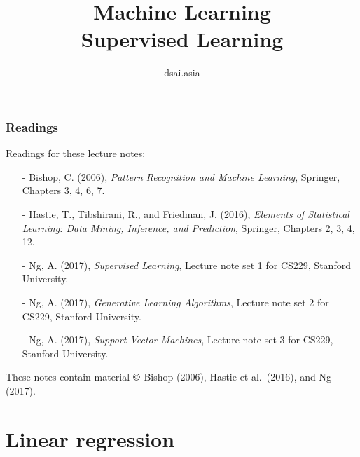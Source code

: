 \documentclass{beamer}
\title[Machine Learning]{Machine Learning\\Supervised Learning}
\author{dsai.asia}
\institute[]{Asian Data Science and Artificial Intelligence Master's Program}
\date{}
\begin{document}


\frame{\titlepage}

%

\begin{frame}
\frametitle{Readings}

Readings for these lecture notes:
\begin{itemize}
\item[-] Bishop, C. (2006), \textit{Pattern Recognition and Machine Learning},
  Springer, Chapters 3, 4, 6, 7.
\item[-] Hastie, T., Tibshirani, R., and Friedman, J. (2016),
  \textit{Elements of Statistical Learning: Data Mining, Inference, and
    Prediction}, Springer, Chapters 2, 3, 4, 12.
\item[-] Ng, A. (2017), \textit{Supervised Learning}, Lecture note set
  1 for CS229, Stanford University.
\item[-] Ng, A. (2017), \textit{Generative Learning Algorithms},
  Lecture note set 2 for CS229, Stanford University.
\item[-] Ng, A. (2017), \textit{Support Vector Machines},
  Lecture note set 3 for CS229, Stanford University.
\end{itemize}

These notes contain material $\copyright$ Bishop (2006), Hastie et
al.\ (2016), and Ng (2017).

\end{frame}

\section{Linear regression}
\end{document}
